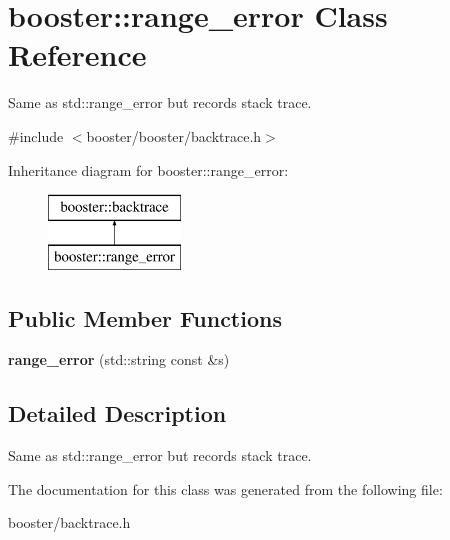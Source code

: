 \section{booster\-:\-:range\-\_\-error \-Class \-Reference}
\label{classbooster_1_1range__error}


\-Same as std\-::range\-\_\-error but records stack trace.  




{\ttfamily \#include $<$booster/booster/backtrace.\-h$>$}

\-Inheritance diagram for booster\-:\-:range\-\_\-error\-:\begin{figure}[H]
\begin{center}
\leavevmode
\includegraphics[height=2.000000cm]{classbooster_1_1range__error}
\end{center}
\end{figure}
\subsection*{\-Public \-Member \-Functions}
\begin{DoxyCompactItemize}
\item 
{\bfseries range\-\_\-error} (std\-::string const \&s)\label{classbooster_1_1range__error_afaeb47be39652f3ca5d0143b8d4721f1}

\end{DoxyCompactItemize}


\subsection{\-Detailed \-Description}
\-Same as std\-::range\-\_\-error but records stack trace. 

\-The documentation for this class was generated from the following file\-:\begin{DoxyCompactItemize}
\item 
booster/backtrace.\-h\end{DoxyCompactItemize}

